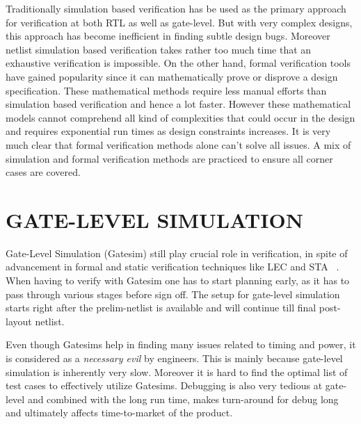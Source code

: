  Traditionally simulation based verification has be used as the primary approach for verification at both RTL as well as gate-level.  But with very complex designs, this approach has become inefficient in finding subtle design bugs. Moreover netlist simulation based verification takes rather too much time that an exhaustive verification is impossible. On the other hand, formal verification tools have gained popularity since it can mathematically prove or disprove a design specification. These mathematical methods require less manual efforts than simulation based verification and hence a lot faster. However these mathematical models cannot comprehend all kind of complexities that could occur in the design and requires exponential run times as design constraints increases. It is very much clear that formal verification methods alone can't solve all issues. A mix of simulation and formal verification methods are practiced to ensure all corner cases are covered. 


\section{GATE-LEVEL SIMULATION}

Gate-Level Simulation (Gatesim) still play crucial role in verification, in spite of advancement in formal and static verification techniques like LEC  and STA ~\citep{ieee:segev:2004}.   When having to verify with Gatesim one has to start planning early, as it has to pass through various stages before sign off. The setup for gate-level simulation starts right after the prelim-netlist is available and will continue till final post-layout netlist.  

Even though Gatesims help in finding many issues related to timing and power, it is considered as a {\it necessary evil} by engineers. This is mainly because gate-level simulation is inherently very slow. Moreover it is hard to find the optimal list of test cases to effectively utilize Gatesims. Debugging is also very tedious at gate-level and combined with the long run time, makes turn-around for debug long and ultimately affects time-to-market of the product.

